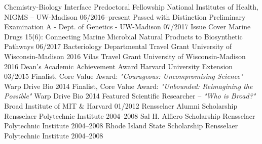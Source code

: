 

\begin{cvhonors}
  \cvhonor
    {Chemistry-Biology Interface Predoctoral Fellowship} %
    {National Institutes of Health, NIGMS -- UW-Madison} %
    {06/2016--present} %
  \cvhonor
    {Passed with Distinction} %
    {Preliminary Examination A - Dept. of Genetics - UW-Madison} %
    {07/2017} %
  \cvhonor
    {Issue Cover} %
    {Marine Drugs 15(6): Connecting Marine Microbial Natural Products to Biosynthetic Pathways} %
    {06/2017} %
  \cvhonor
    {Bacteriology Departmental Travel Grant} %
    {University of Wisconsin-Madison} %
    {2016} %
  \cvhonor
    {Vilas Travel Grant} %
    {University of Wisconsin-Madison} %
    {2016} %
  \cvhonor
    {Dean's Academic Achievement Award} %
    {Harvard University Extension} %
    {03/2015} %
  \cvhonor
    {Finalist, Core Value Award: \textit{"Courageous: Uncompromising Science"}} %
    {Warp Drive Bio} %
    {2014} %
  \cvhonor
    {Finalist, Core Value Award: \textit{"Unbounded: Reimagining the Possible"}} %
    {Warp Drive Bio} %
    {2014} %
  \cvhonor
    {Featured Scientific Researcher -- \textit{"Who is Broad?"}} %
    {Broad Institute of MIT \& Harvard} %
    {01/2012} %
  \cvhonor
    {Rensselaer Alumni Scholarship} %
    {Rensselaer Polytechnic Institute} %
    {2004--2008} %
  \cvhonor
    {Sal H. Alfiero Scholarship} %
    {Rensselaer Polytechnic Institute} %
    {2004--2008} %
  \cvhonor
    {Rhode Island State Scholarship} %
    {Rensselaer Polytechnic Institute} %
    {2004--2008} %
\end{cvhonors}